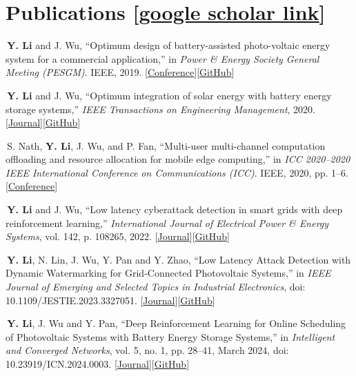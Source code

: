 \documentclass[11pt, letterpaper]{article}
\begin{document}
\section{Publications [\href{https://scholar.google.com/citations?view_op=list_works&hl=en&user=WdrLhUkAAAAJ&sortby=pubdate}{google scholar link}]}

\textbullet\,\textbf{Y. Li} and J. Wu, ``Optimum design of battery-assisted photo-voltaic energy system for a commercial application,'' in \textit{Power \& Energy Society General Meeting (PESGM)}. IEEE, 2019. [\href{https://ieeexplore.ieee.org/document/9001583}{Conference}][\href{https://github.com/Arthurliyaze}{GitHub}]

\textbullet\,\textbf{Y. Li} and J. Wu, ``Optimum integration of solar energy with battery energy storage systems,'' \textit{IEEE Transactions on Engineering Management}, 2020. [\href{https://ieeexplore.ieee.org/document/9001583}{Journal}][\href{https://github.com/Arthurliyaze}{GitHub}]

\textbullet\,S. Nath, \textbf{Y. Li}, J. Wu, and P. Fan, ``Multi-user multi-channel computation offloading and resource allocation for mobile edge computing,'' in \textit{ICC 2020--2020 IEEE International Conference on Communications (ICC)}. IEEE, 2020, pp. 1--6. [\href{https://ieeexplore.ieee.org/document/9149263}{Conference}]

\textbullet\,\textbf{Y. Li} and J. Wu, ``Low latency cyberattack detection in smart grids with deep reinforcement learning,'' \textit{International Journal of Electrical Power \& Energy Systems}, vol. 142, p. 108265, 2022. [\href{https://www.sciencedirect.com/science/article/pii/S0142061522003404}{Journal}][\href{https://github.com/Arthurliyaze}{GitHub}]

\textbullet\,\textbf{Y. Li}, N. Lin, J. Wu, Y. Pan and Y. Zhao, ``Low Latency Attack Detection with Dynamic Watermarking for Grid-Connected Photovoltaic Systems,'' in \textit{IEEE Journal of Emerging and Selected Topics in Industrial Electronics}, doi: 10.1109/JESTIE.2023.3327051. [\href{https://ieeexplore.ieee.org/document/10297604}{Journal}][\href{https://github.com/Arthurliyaze}{GitHub}]

\textbullet\,\textbf{Y. Li}, J. Wu and Y. Pan, ``Deep Reinforcement Learning for Online Scheduling of Photovoltaic Systems with Battery Energy Storage Systems,'' in \textit{Intelligent and Converged Networks}, vol. 5, no. 1, pp. 28--41, March 2024, doi: 10.23919/ICN.2024.0003. [\href{https://ieeexplore.ieee.org/document/10480234}{Journal}][\href{https://github.com/Arthurliyaze}{GitHub}]
\end{document}
